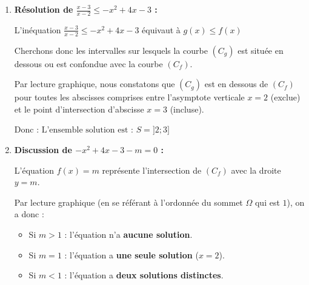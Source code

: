 \documentclass[10pt, a4paper]{article}
\begin{document}
\begin{Solution}
\begin{enumerate}[leftmargin=*,itemsep=0.5pt]
\begin{center}
\end{center}

    \item \textbf{Résolution de $\frac{x-3}{x-2} \leq -x^2+4x-3$ :}

    L'inéquation $\frac{x-3}{x-2} \leq -x^2+4x-3$  équivaut à $g(x) \leq f(x)$

    Cherchons donc les intervalles sur lesquels la courbe $(C_g)$ est située en dessous ou est confondue avec la courbe $(C_f)$.
    
    Par lecture graphique, nous constatons que $(C_g)$ est en dessous de $(C_f)$ pour toutes les abscisses comprises entre l'asymptote verticale $x=2$ (exclue) et le point d'intersection d'abscisse $x=3$ (incluse).
    
    Donc : \quad $ \text{L'ensemble solution est : } S = \big]2; 3\big] $

    \item \textbf{Discussion de $-x^2+4x-3-m = 0$ :}

    L'équation $f(x) = m$ représente l'intersection de $(C_f)$ avec la droite $y = m$.

Par lecture graphique (en se référant à l'ordonnée du sommet $\Omega$ qui est $1$), on a donc :

    \begin{itemize}[leftmargin=*,itemsep=0.5pt]
        \item Si $m > 1$  : l'équation n'a \textbf{aucune solution}.
        \item Si $m = 1$  : l'équation a \textbf{une seule solution} ($x = 2$).
        \item Si $m < 1$  : l'équation a \textbf{deux solutions distinctes}.
    \end{itemize}
\end{enumerate}
\end{Solution}
\end{document}
